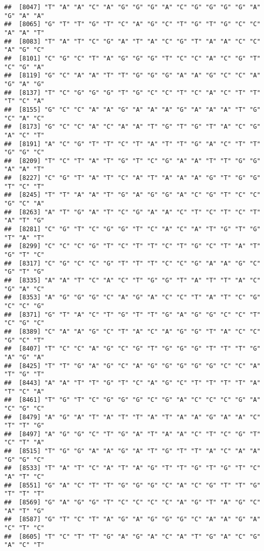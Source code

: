 \documentclass[
]{article}
\begin{document}
\begin{verbatim}
##  [8047] "T" "A" "A" "C" "A" "G" "G" "G" "A" "C" "G" "G" "G" "G" "A" "G" "A" "A"
##  [8065] "G" "T" "T" "G" "T" "C" "A" "G" "C" "T" "G" "T" "G" "C" "C" "A" "A" "T"
##  [8083] "T" "A" "T" "C" "G" "A" "T" "A" "C" "G" "T" "A" "A" "C" "C" "A" "G" "C"
##  [8101] "C" "G" "C" "T" "A" "G" "G" "G" "T" "C" "C" "A" "C" "G" "T" "C" "G" "A"
##  [8119] "G" "C" "A" "A" "T" "T" "G" "G" "G" "A" "A" "G" "C" "C" "A" "G" "A" "G"
##  [8137] "T" "C" "G" "G" "G" "T" "G" "C" "C" "T" "C" "A" "C" "T" "T" "T" "C" "A"
##  [8155] "G" "C" "C" "A" "A" "G" "A" "A" "A" "G" "A" "A" "A" "T" "G" "C" "A" "C"
##  [8173] "G" "C" "C" "A" "C" "A" "A" "T" "G" "T" "G" "T" "A" "C" "G" "A" "C" "T"
##  [8191] "A" "C" "G" "T" "T" "C" "T" "A" "T" "T" "G" "A" "C" "T" "T" "G" "G" "C"
##  [8209] "T" "C" "T" "A" "T" "G" "T" "C" "G" "A" "A" "T" "T" "G" "G" "A" "A" "T"
##  [8227] "C" "G" "T" "A" "T" "C" "A" "T" "A" "A" "A" "G" "T" "G" "G" "T" "C" "T"
##  [8245] "T" "T" "A" "A" "T" "G" "A" "G" "G" "A" "C" "G" "T" "C" "C" "G" "C" "A"
##  [8263] "A" "T" "G" "A" "T" "C" "G" "A" "A" "C" "T" "C" "T" "C" "T" "A" "T" "G"
##  [8281] "C" "G" "T" "C" "G" "G" "T" "C" "A" "C" "A" "T" "G" "T" "G" "T" "A" "T"
##  [8299] "C" "C" "C" "G" "T" "C" "T" "T" "C" "T" "G" "C" "T" "A" "T" "G" "T" "C"
##  [8317] "C" "G" "C" "C" "G" "T" "T" "T" "C" "C" "G" "A" "A" "G" "C" "G" "T" "G"
##  [8335] "A" "A" "T" "C" "A" "C" "T" "G" "G" "T" "A" "T" "T" "A" "C" "G" "A" "C"
##  [8353] "A" "G" "G" "G" "C" "A" "G" "A" "C" "C" "T" "A" "T" "C" "G" "C" "C" "G"
##  [8371] "G" "T" "A" "C" "T" "G" "T" "T" "G" "A" "G" "G" "C" "C" "T" "C" "G" "C"
##  [8389] "C" "A" "A" "G" "C" "T" "A" "C" "A" "G" "G" "T" "A" "C" "C" "G" "C" "T"
##  [8407] "T" "C" "C" "A" "G" "C" "G" "T" "G" "G" "G" "T" "T" "T" "G" "A" "G" "A"
##  [8425] "T" "T" "G" "A" "G" "C" "A" "G" "G" "G" "G" "G" "C" "C" "A" "T" "G" "T"
##  [8443] "A" "A" "T" "T" "G" "T" "C" "A" "G" "C" "T" "T" "T" "T" "A" "T" "C" "A"
##  [8461] "T" "G" "T" "C" "G" "G" "G" "C" "G" "A" "C" "C" "C" "G" "A" "C" "G" "C"
##  [8479] "A" "G" "A" "T" "A" "T" "T" "A" "T" "A" "A" "G" "A" "A" "C" "T" "T" "G"
##  [8497] "A" "G" "G" "C" "T" "G" "A" "T" "A" "A" "C" "T" "C" "G" "T" "C" "T" "A"
##  [8515] "T" "G" "G" "A" "A" "G" "A" "T" "G" "T" "T" "A" "C" "A" "A" "G" "G" "C"
##  [8533] "T" "A" "T" "C" "A" "T" "A" "G" "T" "T" "G" "T" "G" "T" "C" "A" "T" "C"
##  [8551] "G" "A" "C" "T" "T" "G" "G" "G" "C" "A" "C" "G" "T" "T" "G" "T" "T" "T"
##  [8569] "G" "A" "G" "G" "T" "C" "C" "C" "C" "A" "G" "T" "A" "G" "C" "A" "T" "G"
##  [8587] "G" "T" "C" "T" "A" "G" "A" "G" "G" "G" "C" "A" "A" "G" "A" "C" "T" "C"
##  [8605] "T" "C" "T" "T" "G" "A" "G" "A" "C" "A" "T" "G" "A" "C" "G" "A" "C" "T"

\end{verbatim}
\end{document}
